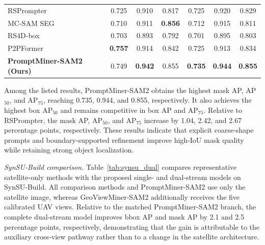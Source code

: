 \documentclass[letterpaper,journal]{IEEEtran}
\begin{document}
\begin{table}[!t]
\begin{tabular}{lcccccc}
RSPrompter~\cite{ref_rsprompter} & 0.725 & 0.910 & 0.817 & 0.725 & 0.920 & 0.829 \\
MC-SAM SEG~\cite{ref_mcsamseg} & 0.710 & 0.911 & \textbf{0.856} & 0.712 & 0.915 & 0.811 \\
RS4D-box~\cite{ref_rs4d} & 0.703 & 0.893 & 0.792 & 0.701 & 0.895 & 0.803 \\
P2PFormer~\cite{ref_p2pformer} & \textbf{0.757} & 0.914 & 0.842 & 0.725 & 0.913 & 0.834 \\
\textbf{PromptMiner-SAM2 (Ours)} & 0.749 & \textbf{0.942} & 0.855 & \textbf{0.735} & \textbf{0.944} & \textbf{0.855} \\
\bottomrule
\end{tabular}
\end{table}

Among the listed results, PromptMiner-SAM2 obtains the highest mask AP, AP$_{50}$, and AP$_{75}$, reaching 0.735, 0.944, and 0.855, respectively. It also achieves the highest box AP$_{50}$ and remains competitive in box AP and AP$_{75}$. Relative to RSPrompter, the mask AP, AP$_{50}$, and AP$_{75}$ increase by 1.04, 2.42, and 2.67 percentage points, respectively. These results indicate that explicit coarse-shape prompts and boundary-supported refinement improve high-IoU mask quality while retaining strong object localization.

\noindent\textit{SynSU-Build comparison.}
Table~\ref{tab:synsu_dual} compares representative satellite-only methods with the proposed single- and dual-stream models on SynSU-Build. All comparison methods and PromptMiner-SAM2 use only the satellite image, whereas GeoViewMiner-SAM2 additionally receives the five calibrated UAV views. Relative to the matched PromptMiner-SAM2 branch, the complete dual-stream model improves bbox AP and mask AP by 2.1 and 2.5 percentage points, respectively, demonstrating that the gain is attributable to the auxiliary cross-view pathway rather than to a change in the satellite architecture.
\end{document}
